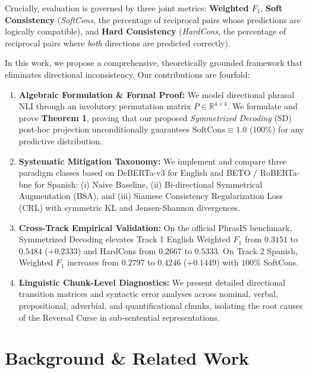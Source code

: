 \documentclass[11pt,a4paper,twocolumn]{article}
\begin{document}
Crucially, evaluation is governed by three joint metrics: \textbf{Weighted $F_1$}, \textbf{Soft Consistency} (\textit{SoftCons}, the percentage of reciprocal pairs whose predictions are logically compatible), and \textbf{Hard Consistency} (\textit{HardCons}, the percentage of reciprocal pairs where \textit{both} directions are predicted correctly).

In this work, we propose a comprehensive, theoretically grounded framework that eliminates directional inconsistency. Our contributions are fourfold:
\begin{enumerate}
    \item \textbf{Algebraic Formulation \& Formal Proof:} We model directional phrasal NLI through an involutory permutation matrix $P \in \mathbb{R}^{4 \times 4}$. We formulate and prove \textbf{Theorem 1}, proving that our proposed \textit{Symmetrized Decoding} (SD) post-hoc projection unconditionally guarantees $\text{SoftCons} \equiv 1.0$ ($100\%$) for any predictive distribution.
    \item \textbf{Systematic Mitigation Taxonomy:} We implement and compare three paradigm classes based on DeBERTa-v3 \citep{he2021debertav3} for English and BETO / RoBERTa-bne \citep{canete2020beto,gutierrezfandino2022mariah} for Spanish: (i) Naive Baseline, (ii) Bi-directional Symmetrical Augmentation (BSA), and (iii) Siamese Consistency Regularization Loss (CRL) with symmetric KL and Jensen-Shannon divergences.
    \item \textbf{Cross-Track Empirical Validation:} On the official PhrasIS benchmark, Symmetrized Decoding elevates Track 1 English Weighted $F_1$ from $0.3151$ to $0.5484$ ($+0.2333$) and HardCons from $0.2667$ to $0.5333$. On Track 2 Spanish, Weighted $F_1$ increases from $0.2797$ to $0.4246$ ($+0.1449$) with $100\%$ SoftCons.
    \item \textbf{Linguistic Chunk-Level Diagnostics:} We present detailed directional transition matrices and syntactic error analyses across nominal, verbal, prepositional, adverbial, and quantificational chunks, isolating the root causes of the Reversal Curse in sub-sentential representations.
\end{enumerate}

\section{Background \& Related Work}
\label{sec:background}
\end{document}
